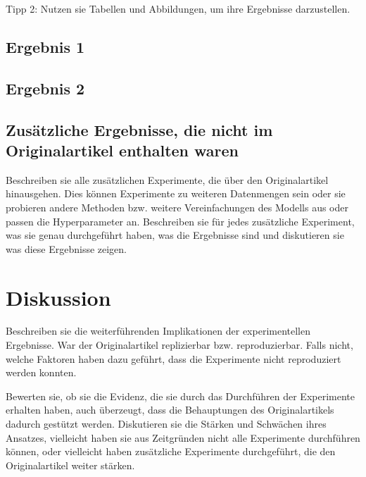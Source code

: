 \documentclass[DIV=13,fontsize=11pt]{scrartcl}
\begin{document}
Tipp 2: Nutzen sie Tabellen und Abbildungen, um ihre Ergebnisse darzustellen. 


\subsection{Ergebnis 1}

\subsection{Ergebnis 2}

\subsection{Zusätzliche Ergebnisse, die nicht im Originalartikel enthalten waren}
Beschreiben sie alle zusätzlichen Experimente, die über den Originalartikel hinausgehen.
Dies können Experimente zu weiteren Datenmengen sein oder sie probieren andere Methoden bzw. weitere Vereinfachungen des Modells aus oder passen die Hyperparameter an.
Beschreiben sie für jedes zusätzliche Experiment, was sie genau durchgeführt haben, was die Ergebnisse sind und diskutieren sie was diese Ergebnisse zeigen. 


\section{Diskussion}
Beschreiben sie die weiterführenden Implikationen der experimentellen Ergebnisse.
War der Originalartikel replizierbar bzw. reproduzierbar.
Falls nicht, welche Faktoren haben dazu geführt, dass die Experimente nicht reproduziert werden konnten. 


Bewerten sie, ob sie die Evidenz, die sie durch das Durchführen der Experimente erhalten haben, auch überzeugt, dass die Behauptungen des Originalartikels dadurch gestützt werden.
Diskutieren sie die Stärken und Schwächen ihres Ansatzes, vielleicht haben sie aus Zeitgründen nicht alle Experimente durchführen können, oder vielleicht haben zusätzliche Experimente durchgeführt, die den Originalartikel weiter stärken. 
\end{document}
